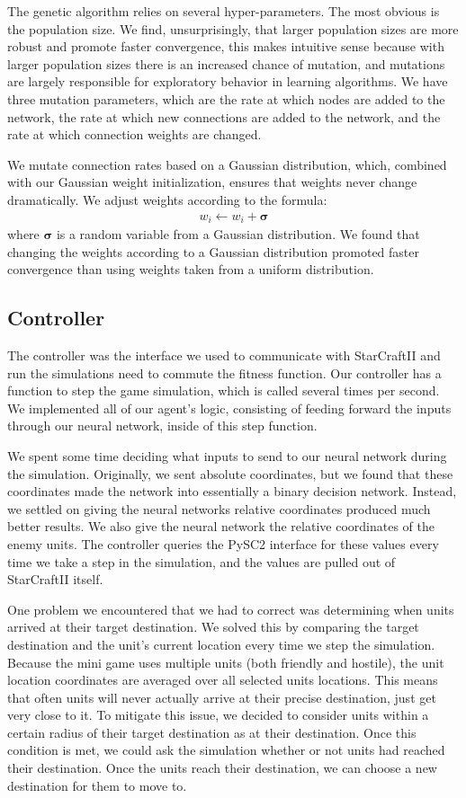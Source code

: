 \documentclass{article}
\begin{document}
The genetic algorithm relies on several hyper-parameters. The most obvious is
the population size. We find, unsurprisingly, that larger population sizes are
more robust and promote faster convergence, this makes intuitive sense because
with larger population sizes there is an increased chance of mutation, and
mutations are largely responsible for exploratory behavior in learning
algorithms. We have three mutation parameters, which are the rate at which nodes
are added to the network, the rate at which new connections are added to the
network, and the rate at which connection weights are changed.

We mutate connection rates based on a Gaussian distribution, which, combined
with our Gaussian weight initialization, ensures that weights never change
dramatically. We adjust weights according to the formula:
\begin{align}
  w_i \leftarrow w_i + \bm{\sigma}
\end{align}
where $\bm{\sigma}$ is a random variable from a Gaussian
distribution. We found that changing the weights according to a Gaussian
distribution promoted faster convergence than using weights taken from a uniform
distribution.

\subsection{Controller}
The controller was the interface we used to communicate with StarCraftII and run
the simulations need to commute the fitness function. Our controller has a
function to step the game simulation, which is called several times per
second. We implemented all of our agent's logic, consisting of feeding forward
the inputs through our neural network, inside of this step function.

We spent some time deciding what inputs to send to our neural network during the
simulation. Originally, we sent absolute coordinates, but we found that these
coordinates made the network into essentially a binary decision
network. Instead, we settled on giving the neural networks relative coordinates
produced much better results. We also give the neural network the relative
coordinates of the enemy units. The controller queries the PySC2 interface for
these values every time we take a step in the simulation, and the values are
pulled out of StarCraftII itself.

One problem we encountered that we had to correct was determining when units
arrived at their target destination.  We solved this by comparing the target
destination and the unit's current location every time we step the simulation.
Because the mini game uses multiple units (both friendly and hostile), the unit
location coordinates are averaged over all selected units locations.  This means
that often units will never actually arrive at their precise destination, just
get very close to it. To mitigate this issue, we decided to consider units
within a certain radius of their target destination as at their destination.
Once this condition is met, we could ask the simulation whether or not units had
reached their destination. Once the units reach their destination, we can choose
a new destination for them to move to.
\end{document}
